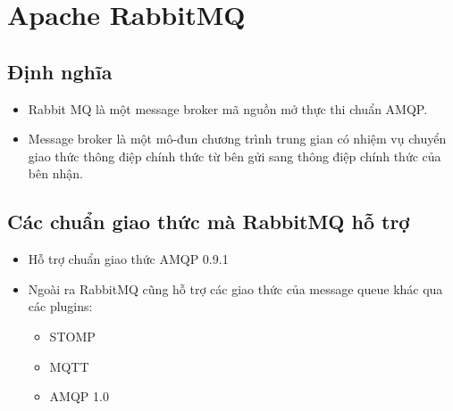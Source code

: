 \section{Apache RabbitMQ}
\subsection{Định nghĩa}
\begin{itemize}
 \item Rabbit MQ là một message broker mã nguồn mở thực thi chuẩn AMQP. 
 \item Message broker là một mô-đun chương trình trung gian có nhiệm vụ chuyển giao thức thông điệp chính thức từ bên gửi sang thông điệp chính thức của bên nhận.
\end{itemize}

\subsection{Các chuẩn giao thức mà RabbitMQ hỗ trợ}
\begin{itemize}
	\item Hỗ trợ chuẩn giao thức AMQP 0.9.1
	\item Ngoài ra RabbitMQ cũng hỗ trợ các giao thức của message queue khác qua các plugins:
	\begin{itemize}
		\item STOMP
		\item MQTT
		\item AMQP 1.0
	\end{itemize}
\end{itemize}
